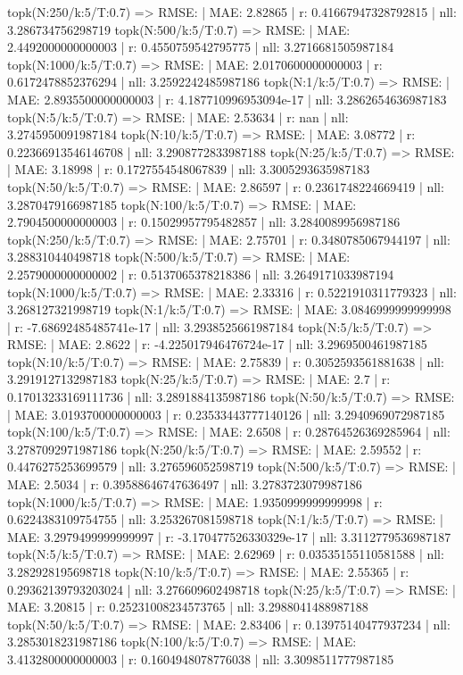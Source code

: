 topk(N:250/k:5/T:0.7) => RMSE: | MAE: 2.82865 | r: 0.41667947328792815 | nll: 3.286734756298719
topk(N:500/k:5/T:0.7) => RMSE: | MAE: 2.4492000000000003 | r: 0.4550759542795775 | nll: 3.2716681505987184
topk(N:1000/k:5/T:0.7) => RMSE: | MAE: 2.0170600000000003 | r: 0.6172478852376294 | nll: 3.2592242485987186
topk(N:1/k:5/T:0.7) => RMSE: | MAE: 2.8935500000000003 | r: 4.187710996953094e-17 | nll: 3.2862654636987183
topk(N:5/k:5/T:0.7) => RMSE: | MAE: 2.53634 | r: nan | nll: 3.2745950091987184
topk(N:10/k:5/T:0.7) => RMSE: | MAE: 3.08772 | r: 0.22366913546146708 | nll: 3.2908772833987188
topk(N:25/k:5/T:0.7) => RMSE: | MAE: 3.18998 | r: 0.1727554548067839 | nll: 3.3005293635987183
topk(N:50/k:5/T:0.7) => RMSE: | MAE: 2.86597 | r: 0.2361748224669419 | nll: 3.2870479166987185
topk(N:100/k:5/T:0.7) => RMSE: | MAE: 2.7904500000000003 | r: 0.15029957795482857 | nll: 3.2840089956987186
topk(N:250/k:5/T:0.7) => RMSE: | MAE: 2.75701 | r: 0.3480785067944197 | nll: 3.288310440498718
topk(N:500/k:5/T:0.7) => RMSE: | MAE: 2.2579000000000002 | r: 0.5137065378218386 | nll: 3.2649171033987194
topk(N:1000/k:5/T:0.7) => RMSE: | MAE: 2.33316 | r: 0.5221910311779323 | nll: 3.268127321998719
topk(N:1/k:5/T:0.7) => RMSE: | MAE: 3.0846999999999998 | r: -7.68692485485741e-17 | nll: 3.2938525661987184
topk(N:5/k:5/T:0.7) => RMSE: | MAE: 2.8622 | r: -4.225017946476724e-17 | nll: 3.2969500461987185
topk(N:10/k:5/T:0.7) => RMSE: | MAE: 2.75839 | r: 0.3052593561881638 | nll: 3.2919127132987183
topk(N:25/k:5/T:0.7) => RMSE: | MAE: 2.7 | r: 0.17013233169111736 | nll: 3.2891884135987186
topk(N:50/k:5/T:0.7) => RMSE: | MAE: 3.0193700000000003 | r: 0.23533443777140126 | nll: 3.2940969072987185
topk(N:100/k:5/T:0.7) => RMSE: | MAE: 2.6508 | r: 0.28764526369285964 | nll: 3.2787092971987186
topk(N:250/k:5/T:0.7) => RMSE: | MAE: 2.59552 | r: 0.4476275253699579 | nll: 3.276596052598719
topk(N:500/k:5/T:0.7) => RMSE: | MAE: 2.5034 | r: 0.39588646747636497 | nll: 3.2783723079987186
topk(N:1000/k:5/T:0.7) => RMSE: | MAE: 1.9350999999999998 | r: 0.6224383109754755 | nll: 3.253267081598718
topk(N:1/k:5/T:0.7) => RMSE: | MAE: 3.2979499999999997 | r: -3.170477526330329e-17 | nll: 3.3112779536987187
topk(N:5/k:5/T:0.7) => RMSE: | MAE: 2.62969 | r: 0.03535155110581588 | nll: 3.282928195698718
topk(N:10/k:5/T:0.7) => RMSE: | MAE: 2.55365 | r: 0.29362139793203024 | nll: 3.276609602498718
topk(N:25/k:5/T:0.7) => RMSE: | MAE: 3.20815 | r: 0.25231008234573765 | nll: 3.2988041488987188
topk(N:50/k:5/T:0.7) => RMSE: | MAE: 2.83406 | r: 0.13975140477937234 | nll: 3.2853018231987186
topk(N:100/k:5/T:0.7) => RMSE: | MAE: 3.4132800000000003 | r: 0.1604948078776038 | nll: 3.3098511777987185
